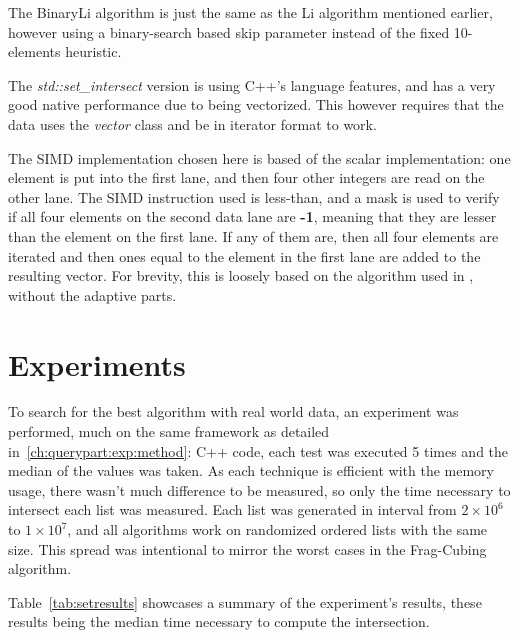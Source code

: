 The BinaryLi algorithm is just the same as the Li algorithm mentioned earlier, however using a binary-search based skip parameter instead of the fixed 10-elements heuristic.

The \textit{std::set\_intersect} version is using C++'s language features, and has a very good native performance due to being vectorized.
This however requires that the data uses the \textit{vector} class and be in iterator format to work.

The SIMD implementation chosen here is based of the scalar implementation: one element is put into the first lane, and then four other integers are read on the other lane.
The SIMD instruction used is less-than, and a mask is used to verify if all four elements on the second data lane are \textbf{-1}, meaning that they are lesser than the element on the first lane.
If any of them are, then all four elements are iterated and then ones equal to the element in the first lane are added to the resulting vector.
For brevity, this is loosely based on the algorithm used in \cite{inoueFasterSetIntersection2014}, without the adaptive parts.

\section{Experiments}\label{ap:a:results}

To search for the best algorithm with real world data, an experiment was performed, much on the same framework as detailed in~\ref{ch:querypart:exp:method}: C++ code, each test was executed 5 times and the median of the values was taken.
As each technique is efficient with the memory usage, there wasn't much difference to be measured, so only the time necessary to intersect each list was measured.
Each list was generated in interval from $2\times10^6$ to $1\times10^7$, and all algorithms work on randomized ordered lists with the same size.
This spread was intentional to mirror the worst cases in the Frag-Cubing algorithm.

Table~\ref{tab:setresults} showcases a summary of the experiment's results, these results being the median time necessary to compute the intersection.

